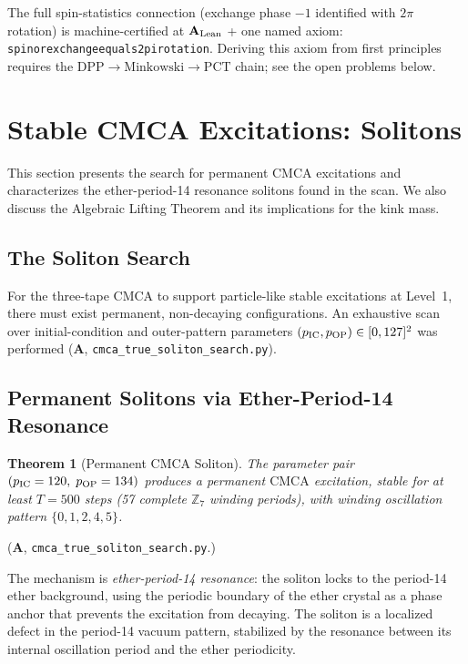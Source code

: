 \documentclass[11pt]{article}
\newtheorem{theorem}{Theorem}[section]
\theoremstyle{remark}
\newcommand{\ZS}{\mathbb{Z}_7}
\newcommand{\lean}[1]{%
  \penalty-100
  \begingroup\def\_{\textunderscore\allowbreak}\texttt{#1}\endgroup}
\newcommand{\CatA}{\textbf{A}}
\newcommand{\CatAL}{\ensuremath{\textbf{A}_{\rm Lean}}}
\newcommand{\CMCA}{\text{CMCA}}
\begin{document}
The full spin-statistics connection (exchange phase $-1$ identified with
$2\pi$ rotation) is machine-certified at $\CatAL$ + one named axiom:
\lean{spinor\_exchange\_equals\_2pi\_rotation}.  Deriving this axiom from first
principles requires the $\mathrm{DPP} \to \text{Minkowski} \to \text{PCT}$ chain;
see the open problems below.

\FloatBarrier

\section{Stable CMCA Excitations: Solitons}
\label{sec:solitons}

This section presents the search for permanent $\CMCA$ excitations and
characterizes the ether-period-14 resonance solitons found in the scan.
We also discuss the Algebraic Lifting Theorem and its implications for
the kink mass.

\subsection{The Soliton Search}

For the three-tape $\CMCA$ to support particle-like stable excitations at
Level~1, there must exist permanent, non-decaying configurations. An
exhaustive scan over initial-condition and outer-pattern parameters
$(p_{\rm IC}, p_{\rm OP}) \in [0, 127]^2$ was performed
($\CatA$, \texttt{cmca\_true\_soliton\_search.py}).

\subsection{Permanent Solitons via Ether-Period-14 Resonance}

\begin{theorem}[Permanent CMCA Soliton]
\label{thm:soliton}
The parameter pair $(p_{\rm IC} = 120,\; p_{\rm OP} = 134)$ produces a
permanent $\CMCA$ excitation, stable for at least $T = 500$ steps
(57 complete $\ZS$ winding periods), with winding oscillation pattern
$\{0, 1, 2, 4, 5\}$.
\end{theorem}
($\CatA$, \texttt{cmca\_true\_soliton\_search.py}.)

The mechanism is \emph{ether-period-14 resonance}: the soliton locks to the
period-14 ether background, using the periodic boundary of the ether crystal
as a phase anchor that prevents the excitation from decaying. The soliton
is a localized defect in the period-14 vacuum pattern, stabilized by the
resonance between its internal oscillation period and the ether periodicity.
\end{document}
